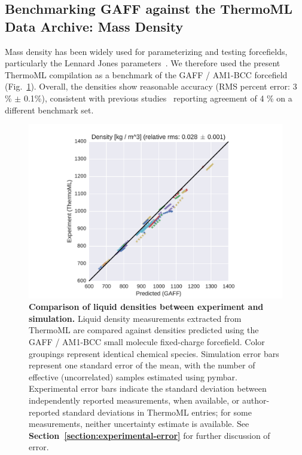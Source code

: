 \documentclass[aps,pre,twocolumn,nofootinbib,superscriptaddress,linenumbers]{revtex4-1}
\begin{document}

\subsection{Benchmarking GAFF against the ThermoML Data Archive: Mass Density}

Mass density has been widely used for parameterizing and testing forcefields, particularly the Lennard Jones parameters~\cite{jorgensen1983comparison, jorgensen1984optimized}.
We therefore used the present ThermoML compilation as a benchmark of the GAFF / AM1-BCC forcefield (Fig.~\ref{figure:Density}).  
Overall, the densities show reasonable accuracy (RMS percent error: 3 \% $\pm$ 0.1\%), consistent with previous studies~\cite{caleman2011force} reporting agreement of 4 \% on a different benchmark set.  


\begin{figure}
\includegraphics[width=\columnwidth]{./figures/densities_thermoml.pdf}
\caption{{\bf Comparison of liquid densities between experiment and simulation.}
Liquid density measurements extracted from ThermoML are compared against densities predicted using the GAFF / AM1-BCC small molecule fixed-charge forcefield.
Color groupings represent identical chemical species.  
Simulation error bars represent one standard error of the mean, with the number of effective (uncorrelated) samples estimated using pymbar.  
Experimental error bars indicate the standard deviation between independently reported measurements, when available, or author-reported standard deviations in ThermoML entries; for some measurements, neither uncertainty estimate is available.  
See {\bf Section~\ref{section:experimental-error}} for further discussion of error.
}
\label{figure:Density}
\end{figure}
\end{document}
